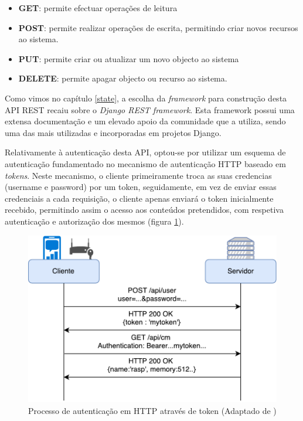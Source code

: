 \begin{itemize}
	\item \textbf{GET}: permite efectuar operações de leitura 
	\item \textbf{POST}: permite realizar operações de escrita, permitindo criar novos recursos ao sistema.
	\item \textbf{PUT}: permite criar ou atualizar um novo objecto ao sistema 
	\item \textbf{DELETE}: permite apagar objecto ou recurso ao sistema. 
\end{itemize}




Como vimos no capítulo \ref{state}, a escolha da \textit{framework} para construção desta \ac{API} \ac{REST} recaiu sobre o \textit{Django REST framework}. Esta framework possui uma extensa documentação e um elevado apoio da comunidade que a utiliza, sendo uma das mais utilizadas e incorporadas em projetos Django. 

Relativamente à autenticação desta \ac{API}, optou-se por utilizar um esquema de autenticação fundamentado no mecanismo de autenticação \ac{HTTP} baseado em \textit{tokens}\cite{tokenREST}. Neste mecanismo, o cliente primeiramente troca as suas credencias (username e password) por um token, seguidamente, em vez de enviar essas credenciais a cada requisição, o cliente apenas enviará o token inicialmente recebido, permitindo assim o acesso aos conteúdos pretendidos, com respetiva autenticação e autorização dos mesmos (figura \ref{autnetAPI}).


\begin{figure}[h]
	\centering
	\includegraphics[scale=0.61]{esquemas/autenticacaohttpesquema.pdf}
	\caption[Processo de autenticação em \ac{HTTP} através de token]{Processo de autenticação em \ac{HTTP} através de token (Adaptado de \cite{AdoKukic2016})}
	\label{autnetAPI}
\end{figure}


